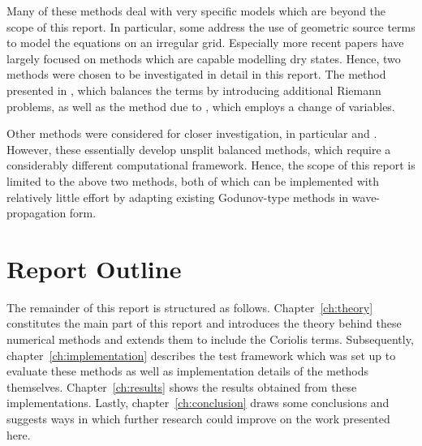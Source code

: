Many of these methods deal with very specific models which are beyond the scope of this report. In particular, some address the use of geometric source terms to model the equations on an irregular grid. Especially more recent papers have largely focused on methods which are capable modelling dry states. Hence, two methods were chosen to be investigated in detail in this report. The method presented in \citet{leveque1998balancing}, which balances the terms by introducing additional Riemann problems, as well as the method due to \citet{rogers2003mathematical}, which employs a change of variables.

Other methods were considered for closer investigation, in particular \citet{hubbard2000flux} and \citet{chertockwell}. However, these essentially develop unsplit balanced methods, which require a considerably different computational framework. Hence, the scope of this report is limited to the above two methods, both of which can be implemented with relatively little effort by adapting existing Godunov-type methods in wave-propagation form.

\section{Report Outline}

The remainder of this report is structured as follows. Chapter~\ref{ch:theory} constitutes the main part of this report and introduces the theory behind these numerical methods and extends them to include the Coriolis terms. Subsequently, chapter~\ref{ch:implementation} describes the test framework which was set up to evaluate these methods as well as implementation details of the methods themselves. Chapter~\ref{ch:results} shows the results obtained from these implementations. Lastly, chapter~\ref{ch:conclusion} draws some conclusions and suggests ways in which further research could improve on the work presented here.